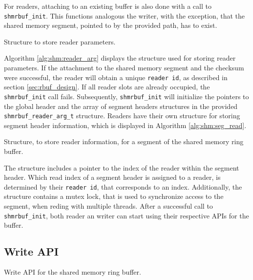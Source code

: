 \par
For readers, attaching to an existing buffer is also done with a call to \texttt{shmrbuf\_init}. This functions analogous the writer, with the exception, that the
shared memory segment, pointed to by the provided path, has to exist. 
\begin{algorithm}[h!]
    
    \caption[Shared Memory Ringbuffer: Reader Parameters]{Structure to store reader parameters.}
    \label{alg:shm:reader_arg}
\end{algorithm}
Algorithm \ref{alg:shm:reader_arg} displays the structure used for storing reader parameters. If the attachment to the shared memory segment
and the checksum were successful, the reader will obtain a unique \texttt{reader id}, as described in section \ref{sec:rbuf_design}. If all reader slots are already occupied, the \texttt{shmrbuf\_init} call fails.
Subsequently, \texttt{shmrbuf\_init} will initialize the pointers to the global header and the array of segment headers structures in the provided \texttt{shmrbuf\_reader\_arg\_t} structure.  
Readers have their own structure for storing segment header information, which is displayed in Algorithm \ref{alg:shm:seg_read}.  
\begin{algorithm}[h!]
    
    \caption[Shared Memory Ringbuffer: Reader Segment Header]{Structure, to store reader information, for a segment of the shared memory ring buffer.}
    \label{alg:shm:seg_read}
\end{algorithm}

The structure includes a pointer to the index of the reader within the segment header. Which read index of a segment header is assigned to a reader, is determined 
by their \texttt{reader id}, that corresponds to an index. Additionally, the structure contains a mutex lock, that is used to synchronize access to the segment, when reding with multiple threads.
After a successful call to \texttt{shmrbuf\_init}, both reader an writer can start using their respective APIs for the buffer.

\subsection{Write API}

\begin{algorithm}[h!]
    
    \caption[Shared Memory Ringbuffer: Write API]{Write API for the shared memory ring buffer.}
    \label{alg:shm:write_api}
\end{algorithm}

